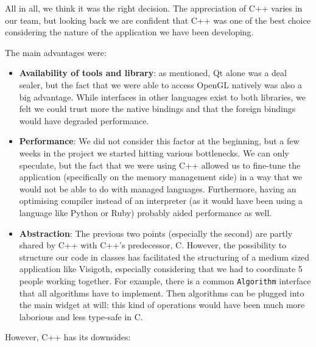 \documentclass[a4paper,11pt,titlepage]{article}
\newcommand{\code}[1]{\texttt{#1}}
\begin{document}
All in all, we think it was the right decision. The appreciation of C++ varies
in our team, but looking back we are confident that C++ was one of the best
choice considering the nature of the application we have been developing.

The main advantages were:

\begin{itemize}

\item
  \textbf{Availability of tools and library}: as mentioned, Qt alone was a deal
  sealer, but the fact that we were able to access OpenGL natively was also a
  big advantage. While interfaces in other languages exist to both libraries, we
  felt we could trust more the native bindings and that the foreign bindings
  would have degraded performance.

\item
  \textbf{Performance}: We did not consider this factor at the beginning, but a
  few weeks in the project we started hitting various bottlenecks. We can only
  speculate, but the fact that we were using C++ allowed us to fine-tune the
  application (specifically on the memory management side) in a way that we
  would not be able to do with managed languages. Furthermore, having an
  optimising compiler instead of an interpreter (as it would have been using a
  language like Python or Ruby) probably aided performance as well.

\item
  \textbf{Abstraction}: The previous two points (especially the second) are
  partly shared by C++ with C++'s predecessor, C. However, the possibility to
  structure our code in classes has facilitated the structuring of a medium
  sized application like Visigoth, especially considering that we had to
  coordinate 5 people working together. For example, there is a common
  \code{Algorithm} interface that all algorithms have to implement. Then
  algorithms can be plugged into the main widget at will: this kind of
  operations would have been much more laborious and less type-safe in C.

\end{itemize}

However, C++ has its downsides:
\end{document}
